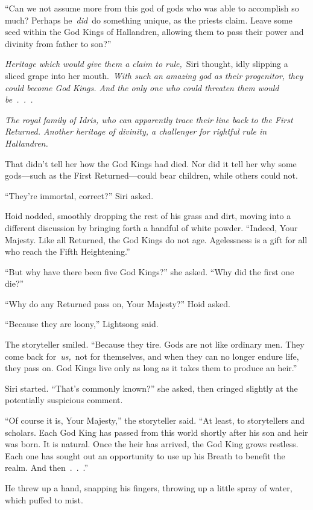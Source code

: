 “Can we not assume more from this god of gods who was able to accomplish so much? Perhaps he~\textit{did}~do something unique, as the priests claim. Leave some seed within the God Kings of Hallandren, allowing them to pass their power and divinity from father to son?”

\textit{Heritage which would give them a claim to rule,}~Siri thought, idly slipping a sliced grape into her mouth.~\textit{With such an amazing god as their progenitor, they could become God Kings. And the only one who could threaten them would be~.~.~.}

\textit{The royal family of Idris, who can apparently trace their line back to the First Returned. Another heritage of divinity, a challenger for rightful rule in Hallandren.}

That didn’t tell her how the God Kings had died. Nor did it tell her why some gods—such as the First Returned—could bear children, while others could not.

“They’re immortal, correct?” Siri asked.

Hoid nodded, smoothly dropping the rest of his grass and dirt, moving into a different discussion by bringing forth a handful of white powder. “Indeed, Your Majesty. Like all Returned, the God Kings do not age. Agelessness is a gift for all who reach the Fifth Heightening.”

“But why have there been five God Kings?” she asked. “Why did the first one die?”

“Why do any Returned pass on, Your Majesty?” Hoid asked.

“Because they are loony,” Lightsong said.

The storyteller smiled. “Because they tire. Gods are not like ordinary men. They come back for~\textit{us,}~not for themselves, and when they can no longer endure life, they pass on. God Kings live only as long as it takes them to produce an heir.”

Siri started. “That’s commonly known?” she asked, then cringed slightly at the potentially suspicious comment.

“Of course it is, Your Majesty,” the storyteller said. “At least, to storytellers and scholars. Each God King has passed from this world shortly after his son and heir was born. It is natural. Once the heir has arrived, the God King grows restless. Each one has sought out an opportunity to use up his Breath to benefit the realm. And then~.~.~.”

He threw up a hand, snapping his fingers, throwing up a little spray of water, which puffed to mist.

